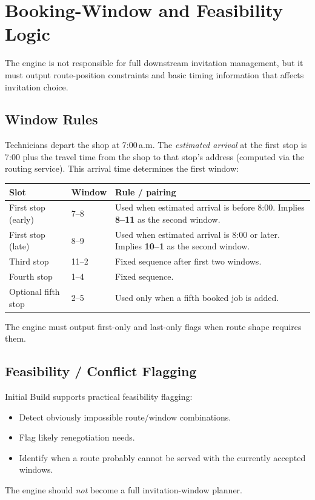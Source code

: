 \documentclass[12pt]{article}
\begin{document}
\section*{Booking-Window and Feasibility Logic}
\label{sec:windows}

The engine is not responsible for full downstream invitation management, but it must output route-position constraints and basic timing information that affects invitation choice.

\subsection*{Window Rules}

Technicians depart the shop at 7:00\,a.m.  The \emph{estimated arrival} at the first stop is 7:00 plus the travel time from the shop to that stop's address (computed via the routing service).  This arrival time determines the first window:

\medskip
{\small
\begin{tabular}{llp{6cm}}
\toprule
\textbf{Slot} & \textbf{Window} & \textbf{Rule / pairing} \\
\midrule
First stop (early)  & 7--8   & Used when estimated arrival is before 8:00.  Implies \textbf{8--11} as the second window. \\
First stop (late)   & 8--9   & Used when estimated arrival is 8:00 or later.  Implies \textbf{10--1} as the second window. \\
Third stop          & 11--2  & Fixed sequence after first two windows. \\
Fourth stop         & 1--4   & Fixed sequence. \\
Optional fifth stop & 2--5   & Used only when a fifth booked job is added. \\
\bottomrule
\end{tabular}
}

\medskip
The engine must output first-only and last-only flags when route shape requires them.

\subsection*{Feasibility / Conflict Flagging}

Initial Build supports practical feasibility flagging:
\begin{itemize}
    \item Detect obviously impossible route/window combinations.
    \item Flag likely renegotiation needs.
    \item Identify when a route probably cannot be served with the currently accepted windows.
\end{itemize}
The engine should \emph{not} become a full invitation-window planner.
\end{document}
